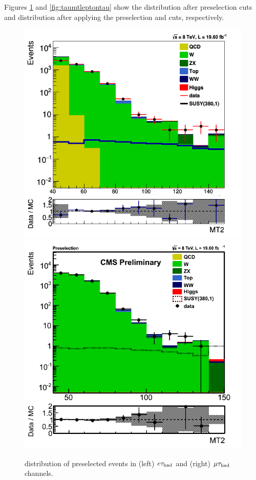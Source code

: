 Figures \ref{fig:mt2leptontau} and \ref{fig:taumtleptontau} show the \mttwo distribution after preselection cuts and  \tauMT 
distribution after applying the preselection and \mttwo cuts, respectively.
\begin{figure}[!Hhtb]
\centering
\includegraphics[angle=0,scale=0.35]{SelectionEleTau/MT2.png}
\includegraphics[angle=0,scale=0.35]{SelectionMuTau/MT2_Ratio_Preselection_unBlinded.png}
\caption{\mttwo distribution of preselected events in (left) $e\tau_{\rm had}$ and (right) $\mu\tau_{\rm had}$ channels.}
\label{fig:mt2leptontau}
\end{figure}



